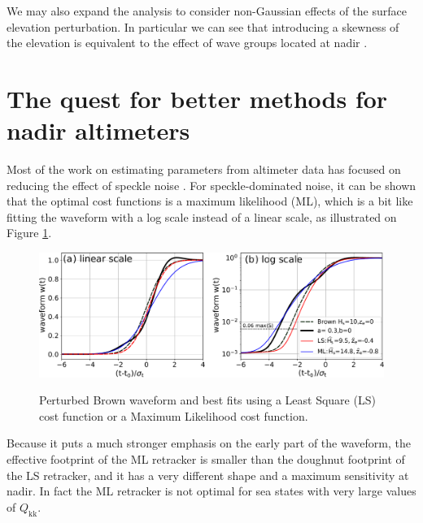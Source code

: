 We may also expand the analysis to consider non-Gaussian effects of the surface elevation perturbation. In particular we can see that introducing a skewness of the elevation is equivalent to the effect of wave groups located at nadir \citep{Hayne1980,DeCarlo&Ardhuin2024}.

\section{The quest for better methods for nadir altimeters}
Most of the work on estimating parameters from altimeter data has focused on reducing the effect of speckle noise \citep{Challenor&Srokosz1989}. For speckle-dominated noise, it can be shown that the optimal cost functions is a  maximum likelihood (ML), which is a bit like fitting the waveform with a log scale instead of a linear scale, as illustrated on Figure \ref{fig:alti_linlog}.
\begin{figure}[h!]
\centerline{\includegraphics[width=\textwidth]{FIGS_CH_SAT/waveforms_lin_log.pdf}}
  \caption{Perturbed Brown waveform and best fits using a Least Square (LS) cost function or a Maximum Likelihood cost function.}{} \label{fig:alti_linlog}
\end{figure}
Because it puts a much stronger emphasis on the early part of the waveform, the effective footprint of the ML retracker is smaller than the doughnut footprint of the LS retracker, and it has a very different shape and a maximum sensitivity at nadir.  In fact the ML retracker is not optimal for sea states with very large values of $Q_{\mathrm{kk}}$.

